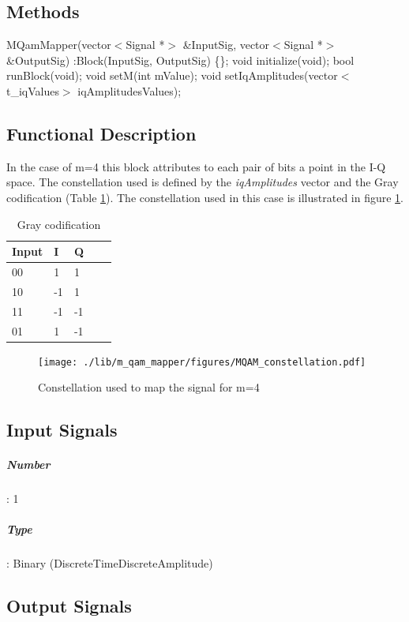 \subsection*{Methods}

MQamMapper(vector$<$Signal *$>$ \&InputSig, vector$<$Signal *$>$ \&OutputSig) :Block(InputSig, OutputSig) \{\};
\bigbreak	
void initialize(void);
\bigbreak	
bool runBlock(void);
\bigbreak	
void setM(int mValue);
\bigbreak	
void setIqAmplitudes(vector$<$t\_iqValues$>$ iqAmplitudesValues);

\subsection*{Functional Description}

In the case of m=4 this block attributes to each pair of bits a point in the I-Q space. The constellation used is defined by the \textit{iqAmplitudes} vector and the Gray codification (Table \ref{gray_table}). The constellation used in this case is illustrated in figure \ref{constellation}.
 
\begin{table}[]
\centering
\begin{tabular}{|l|l|l|l|l|}
\hline
Input & I  & Q \\ \hline
00    & 1  & 1 \\ \hline
10    & -1 & 1 \\ \hline
11    & -1 & -1 \\ \hline
01    & 1  & -1 \\ \hline
\end{tabular}
\caption{Gray codification}
\label{gray_table}
\end{table}

\begin{figure}
	\centering
	\texttt{[image: ./lib/m\_qam\_mapper/figures/MQAM\_constellation.pdf]}
	
	\caption{Constellation used to map the signal for m=4 }\label{constellation}
	
\end{figure}
\pagebreak
\subsection*{Input Signals}

\subparagraph*{Number}: 1

\subparagraph*{Type}: Binary (DiscreteTimeDiscreteAmplitude)

\subsection*{Output Signals}

